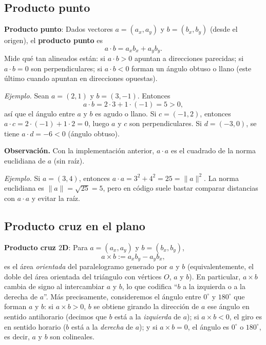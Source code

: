 \subsection*{Producto punto}

\textbf{Producto punto}: Dados vectores $a=(a_x,a_y)$ y $b=(b_x,b_y)$ (desde el origen), el \textbf{producto punto} es
\[
a \cdot b = a_x b_x + a_y b_y.
\]
Mide qué tan alineados están: si $a\cdot b>0$ apuntan a direcciones parecidas; si $a\cdot b=0$ son perpendiculares; si $a\cdot b<0$ forman un ángulo obtuso o llano (este último cuando apuntan en direcciones opuestas).

\textit{Ejemplo.} Sean $a=(2,1)$ y $b=(3,-1)$. Entonces
\[
a\cdot b = 2\cdot 3 + 1\cdot(-1) = 5 > 0,
\]
así que el ángulo entre $a$ y $b$ es agudo o llano. Si $c=(-1,2)$, entonces $a\cdot c = 2\cdot(-1)+1\cdot 2 = 0$, luego $a$ y $c$ son perpendiculares. Si $d=(-3,0)$, se tiene $a\cdot d = -6 < 0$ (ángulo obtuso).



\textbf{Observación.} Con la implementación anterior, $a\cdot a$ es el cuadrado de la norma euclidiana de $a$ (sin raíz).

\textit{Ejemplo.} Si $a=(3,4)$, entonces $a\cdot a = 3^2+4^2 = 25 = \|a\|^2$. La norma euclidiana es $\|a\|=\sqrt{25}=5$, pero en código suele bastar comparar distancias con $a\cdot a$ y evitar la raíz.

\subsection*{Producto cruz en el plano}

\textbf{Producto cruz $2$D}: Para $a=(a_x,a_y)$ y $b=(b_x,b_y)$,
\[
a \times b := a_x b_y - a_y b_x,
\]
es el área \emph{orientada} del paralelogramo generado por $a$ y $b$ (equivalentemente, el doble del área orientada del triángulo con vértices $O$, $a$ y $b$). En particular, $a\times b$ cambia de signo al intercambiar $a$ y $b$, lo que codifica ``$b$ a la izquierda o a la derecha de $a$''. Más precisamente, consideremos el ángulo entre $0^\circ$ y $180^\circ$ que forman $a$ y $b$: si $a\times b>0$, $b$ se obtiene girando la dirección de $a$ ese ángulo en sentido antihorario (decimos que $b$ está a la \emph{izquierda} de $a$); si $a\times b<0$, el giro es en sentido horario ($b$ está a la \emph{derecha} de $a$); y si $a\times b=0$, el ángulo es $0^\circ$ o $180^\circ$, es decir, $a$ y $b$ son colineales.

